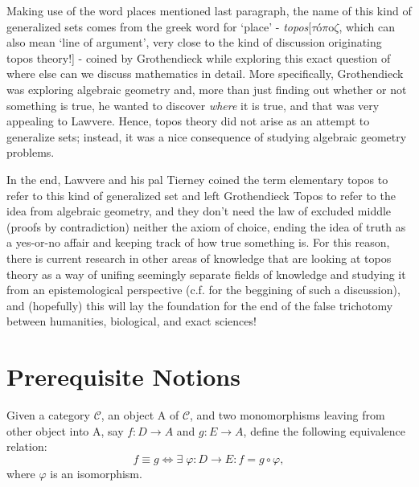 \documentclass{article}
\begin{document}
Making use of the word places mentioned last paragraph, the name of this kind of generalized sets comes from the greek word for `place' - \textit{topos}[\(\tau\text{ó}\pi \mathrm{o}\zeta \), which can also mean `line of argument', very close to the kind of discussion originating topos theory!] - coined by Grothendieck while exploring this exact question of where else can we discuss mathematics in detail. More specifically, Grothendieck was exploring algebraic geometry and, more than just finding out whether or not something is true, he wanted to discover \textit{where} it is true, and that was very appealing to Lawvere. Hence, topos theory did not arise as an attempt to generalize sets; instead, it was a nice consequence of studying algebraic geometry problems.

In the end, Lawvere and his pal Tierney coined the term elementary topos to refer to this kind of generalized set and left Grothendieck Topos to refer to the idea from algebraic geometry, and they don't need the law of excluded middle (proofs by contradiction) neither the axiom of choice, ending the idea of truth as a yes-or-no affair and keeping track of how true something is. For this reason, there is current research in other areas of knowledge that are looking at topos theory as a way of unifing seemingly separate fields of knowledge and studying it from an epistemological perspective (c.f. \cite{stern2013} for the beggining of such a discussion), and (hopefully) this will lay the foundation for the end of the false trichotomy between humanities, biological, and exact sciences!

\section{Prerequisite Notions}
Given a category \(\mathcal{C}\), an object A of \(\mathcal{C}\), and two monomorphisms leaving from other object into A, say \(f:D\rightarrow A\) and \(g:E\rightarrow A\), define the following equivalence relation:
\[
	f\equiv g \Longleftrightarrow \exists\; \varphi:D\rightarrow E: f = g \circ \varphi,
\]
where \(\varphi \) is an isomorphism.
\end{document}
